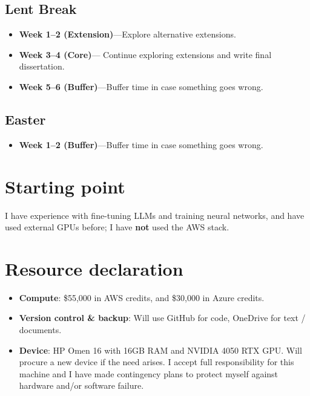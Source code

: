 \documentclass[11pt,a4paper]{scrartcl}
\begin{document}
\subsection{Lent Break}
\begin{itemize}
  \item \textbf{Week 1–2 (Extension)}—Explore alternative extensions.
  \item \textbf{Week 3–4 (Core)}— Continue exploring extensions and write final dissertation.
  \item \textbf{Week 5–6 (Buffer)}—Buffer time in case something goes wrong.
\end{itemize}

\subsection{Easter}
\begin{itemize}
  \item \textbf{Week 1–2 (Buffer)}—Buffer time in case something goes wrong.
\end{itemize}

\section{Starting point}

I have experience with fine-tuning LLMs and training neural networks, and have used external GPUs before; I have \textbf{not} used the AWS stack.
\section{Resource declaration}

\begin{itemize}
  \item \textbf{Compute}: \$55,000 in AWS credits, and \$30,000 in Azure credits. 
  \item \textbf{Version control \& backup}: Will use GitHub for code, OneDrive for text / documents.
  \item \textbf{Device}: HP Omen 16 with 16GB RAM and NVIDIA 4050 RTX GPU. Will procure a new device if the need arises. I accept full responsibility for this machine and I have made contingency plans to protect myself against hardware and/or software failure.

\end{itemize}

\end{document}
